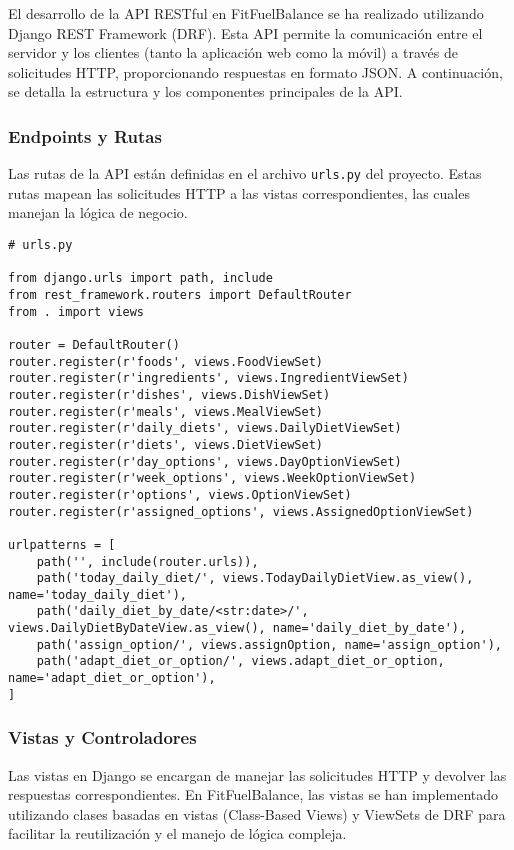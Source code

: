 El desarrollo de la API RESTful en FitFuelBalance se ha realizado utilizando Django REST Framework (DRF). Esta API permite la comunicación entre el servidor y los clientes (tanto la aplicación web como la móvil) a través de solicitudes HTTP, proporcionando respuestas en formato JSON. A continuación, se detalla la estructura y los componentes principales de la API.

\subsubsection{Endpoints y Rutas}
Las rutas de la API están definidas en el archivo \texttt{urls.py} del proyecto. Estas rutas mapean las solicitudes HTTP a las vistas correspondientes, las cuales manejan la lógica de negocio.

\begin{verbatim}
# urls.py

from django.urls import path, include
from rest_framework.routers import DefaultRouter
from . import views

router = DefaultRouter()
router.register(r'foods', views.FoodViewSet)
router.register(r'ingredients', views.IngredientViewSet)
router.register(r'dishes', views.DishViewSet)
router.register(r'meals', views.MealViewSet)
router.register(r'daily_diets', views.DailyDietViewSet)
router.register(r'diets', views.DietViewSet)
router.register(r'day_options', views.DayOptionViewSet)
router.register(r'week_options', views.WeekOptionViewSet)
router.register(r'options', views.OptionViewSet)
router.register(r'assigned_options', views.AssignedOptionViewSet)

urlpatterns = [
    path('', include(router.urls)),
    path('today_daily_diet/', views.TodayDailyDietView.as_view(), name='today_daily_diet'),
    path('daily_diet_by_date/<str:date>/', views.DailyDietByDateView.as_view(), name='daily_diet_by_date'),
    path('assign_option/', views.assignOption, name='assign_option'),
    path('adapt_diet_or_option/', views.adapt_diet_or_option, name='adapt_diet_or_option'),
]
\end{verbatim}

\subsubsection{Vistas y Controladores}
Las vistas en Django se encargan de manejar las solicitudes HTTP y devolver las respuestas correspondientes. En FitFuelBalance, las vistas se han implementado utilizando clases basadas en vistas (Class-Based Views) y ViewSets de DRF para facilitar la reutilización y el manejo de lógica compleja.

